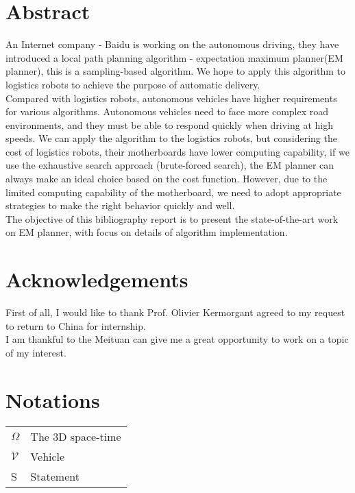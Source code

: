 \documentclass{report}
\begin{document}
   
 
  \section*{Abstract}
\par An Internet company - Baidu is working on the autonomous driving, they have introduced a local path planning algorithm - expectation maximum planner(EM planner), this is a sampling-based algorithm. We hope to apply this algorithm to logistics robots to achieve the purpose of automatic delivery.\\
\indent
Compared with logistics robots, autonomous vehicles have higher requirements for various algorithms. Autonomous vehicles need to face more complex road environments, and they must be able to respond quickly when driving at high speeds.
We can apply the algorithm to the logistics robots, but considering the cost of logistics robots, their motherboards have lower computing capability, if we use the exhaustive search approach (brute-forced search), the EM planner can always make an ideal choice based on the cost function. However, due to the limited computing capability of the motherboard, we need to adopt appropriate strategies to make the right behavior quickly and well.\\
\indent
The objective of this bibliography report is to present the state-of-the-art work on EM planner, with focus on details of algorithm implementation.


 \newpage
 
 \section*{Acknowledgements}
 First of all, I would like to thank Prof. Olivier Kermorgant agreed to my request to return to China for internship. \\
 \indent
 I am thankful to the Meituan can give me a great opportunity to work on a topic of my interest.
 
 \newpage
 
 \section*{Notations}
 \begin{tabular}{ll}
 $\Omega$ & The 3D space-time\\
 $\mathcal V$ & Vehicle\\
 S & Statement
 \end{tabular}
  \newpage
\end{document}
